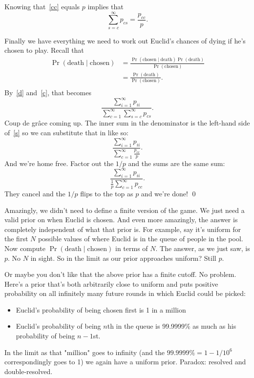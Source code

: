 \documentclass[article,twocolumn]{memoir}
\begin{document}
Knowing that~\eqref{cc} equals $p$ implies that
\begin{equation}\label{s}
\sum\limits_{s=c}^\infty p_{cs} = \frac{p_{cc}}{p}.
\end{equation}

Finally we have everything we need to work out Euclid's chances of dying if he's chosen to play.
Recall that
\begin{align*}
\Pr(\text{death}\mid\text{chosen}) 
& = \frac{\Pr(\text{chosen}\mid\text{death}) \Pr(\text{death})}{\Pr(\text{chosen})} \\
& = \frac{\Pr(\text{death})}{\Pr(\text{chosen})}. \\
\end{align*}
By~\eqref{d} and~\eqref{c}, that becomes
$$
\frac{\sum\limits_{i=1}^\infty p_{ii}}{\sum\limits_{c=1}^\infty\sum\limits_{s=c}^\infty p_{cs}}.
$$
Coup de gr\^ace coming up.
The inner sum in the denominator is the left-hand side of~\eqref{s} so we can substitute that in like so:
$$
\frac{\sum\limits_{i=1}^\infty p_{ii}}{\sum\limits_{c=1}^\infty\frac{p_{cc}}{p}}.
$$
And we're home free.
Factor out the $1/p$ and the sums are the same sum:
$$
\frac{\sum\limits_{i=1}^\infty p_{ii}}{\frac{1}{p}\sum\limits_{c=1}^\infty p_{cc}}.
$$
They cancel and the $1/p$ flips to the top as $p$ and we're done! \qed

Amazingly, we didn't need to define a finite version of the game.
We just need a valid prior on when Euclid is chosen.
And even more amazingly, the answer is completely independent of what that prior is.
For example, say it's uniform for the first $N$ possible values of where Euclid is in the queue of people in the pool.
Now compute $\Pr(\text{death}\mid\text{chosen})$ in terms of $N$.
The answer, as we just saw, is $p$.
No $N$ in sight.
So in the limit as our prior approaches uniform?
Still $p$.

Or maybe you don't like that the above prior has a finite cutoff.
No problem.
Here's a prior that's both arbitrarily close to uniform and puts positive probability on all infinitely many future rounds in which Euclid could be picked:
\begin{itemize}
\item Euclid's probability of being chosen first is 1 in a million
\item Euclid's probability of being $n$th in the queue is 99.9999\% as much as his probability of being $n-1$st.
\end{itemize}
In the limit as that "million" goes to infinity (and the $99.9999\% = 1-1/10^6$ correspondingly goes to 1) we again have a uniform prior.
Paradox: resolved and double-resolved.


\end{document}
